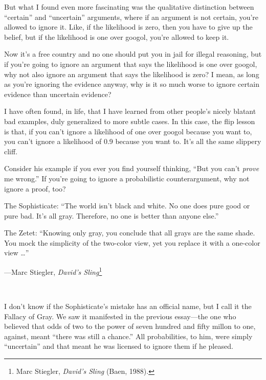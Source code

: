 {
 But what I found even more fascinating was the qualitative
distinction between ``certain'' and
``uncertain'' arguments, where if an
argument is not certain, you're allowed to ignore it.
Like, if the likelihood is zero, then you have to give up the belief,
but if the likelihood is one over googol, you're
allowed to keep it.}

{
 Now it's a free country and no one should put you
in jail for illegal reasoning, but if you're going to
ignore an argument that says the likelihood is one over googol, why not
also ignore an argument that says the likelihood is zero? I mean, as
long as you're ignoring the evidence anyway, why is it
so much worse to ignore certain evidence than uncertain evidence?}

{
 I have often found, in life, that I have learned from other
people's nicely blatant bad examples, duly generalized
to more subtle cases. In this case, the flip lesson is that, if you
can't ignore a likelihood of one over googol because
you want to, you can't ignore a likelihood of 0.9
because you want to. It's all the same slippery cliff.}

{
 Consider his example if you ever you find yourself thinking,
``But you can't \textit{prove} me
wrong.'' If you're going to ignore a
probabilistic counterargument, why not ignore a proof, too?}

\myendsectiontext


{
 The Sophisticate: ``The world
isn't black and white. No one does pure good or pure
bad. It's all gray. Therefore, no one is better than
anyone else.''}

{
 The Zetet: ``Knowing only gray, you conclude that
all grays are the same shade. You mock the simplicity of the two-color
view, yet you replace it with a one-color view
\ldots''}

{\raggedleft
 {}---Marc Stiegler, \textit{David's
Sling}\footnote{Marc Stiegler, \textit{David's Sling} (Baen,
1988).}
\par}


\bigskip

{
 ~}

{
 I don't know if the Sophisticate's
mistake has an official name, but I call it the Fallacy of Gray. We saw
it manifested in the previous essay---the one who believed that odds of
two to the power of seven hundred and fifty millon to one, against,
meant ``there was still a chance.''
All probabilities, to him, were simply
``uncertain'' and that meant he was
licensed to ignore them if he pleased.}


